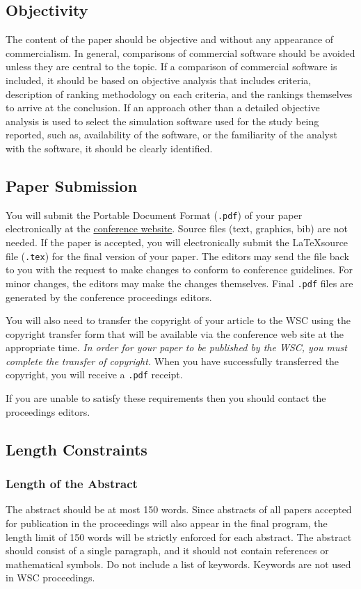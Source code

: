 \documentclass{wscpaperproc}
\theoremstyle{wsc}
\begin{document}
\subsection{Objectivity}
The content of the paper should be objective and without any appearance of commercialism. In general, comparisons of commercial software should be avoided unless they are central to the topic. If a comparison of commercial software is included, it should be based on objective analysis that includes criteria, description of ranking methodology on each criteria, and the rankings themselves to arrive at the conclusion. If an approach other than a detailed objective analysis is used to select the simulation software used for the study being reported, such as, availability of the software, or the familiarity of the analyst with the software, it should be clearly identified.

\subsection{Paper Submission}
You will submit the Portable Document Format ({\tt .pdf}) of your paper electronically at the \href{http://www.wintersim.org}{conference website}. Source files (text, graphics, bib) are not needed. If the paper is accepted, you will electronically submit the \LaTeX  source file
({\tt .tex}) for the final version of your paper. The editors may send the file back to you with the request to make changes to conform to conference guidelines. For minor changes, the editors may make the changes themselves. Final {\tt .pdf} files are generated by the conference proceedings editors.

You will also need to transfer the copyright of your article to the WSC using the copyright transfer form that will be available via the conference web site at the appropriate time. {\em In order for your paper to be published by the WSC, you must complete the transfer of copyright.}
When you have successfully transferred the copyright, you will receive a {\tt .pdf} receipt.

If you are unable to satisfy these requirements then you should contact the proceedings editors.

\subsection{Length Constraints}

\subsubsection{Length of the Abstract}
The abstract should be at most 150 words. Since abstracts of all papers accepted for publication in the proceedings will also appear in the final program, the length limit of 150 words will be strictly enforced for each abstract. The abstract should consist of a single paragraph, and it should not contain references or mathematical symbols. Do not include a list of keywords. Keywords are not used in WSC proceedings.
\end{document}
